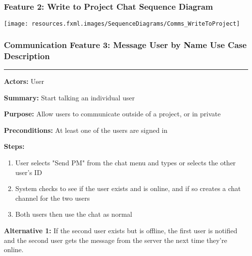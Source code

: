 \documentclass[twoside,letterpaper]{article}
\begin{document}
\subsubsection[Communication Feature 2: Write to Project Chat Sequence Diagram]{\rmfamily\bfseries\color{black}
	Feature 2: Write to Project Chat Sequence Diagram}
\hypertarget{RefHeading22059017292}{}

\bigskip

\texttt{[image: resources.fxml.images/SequenceDiagrams/Comms\_WriteToProject]}

\newpage

\subsubsection[Communication Feature 3: Message User by Name Use Case Description]{\rmfamily\bfseries\color{black}
	Communication Feature 3: Message User by Name Use Case Description}
\hypertarget{RefHeading22059017292}{}

\vspace{2pt}
\hrule
\vspace{8pt}
\textbf{Actors:} User \newline

\noindent\textbf{Summary:} Start talking an individual user \newline

\noindent\textbf{Purpose:} Allow users to communicate outside of a project, or in private \newline

\noindent\textbf{Preconditions:} At least one of the users are signed in \newline

\noindent\textbf{Steps:} \begin{enumerate}
	\item User selects "Send PM" from the chat menu and types or selects the other user's ID
	\item System checks to see if the user exists and is online, and if so creates a chat channel for the two users
	\item Both users then use the chat as normal
\end{enumerate}
\noindent\textbf{Alternative 1:} If the second user exists but is offline, the first user is notified and the second user gets the message from the server the next time they're online. \newline
\end{document}
